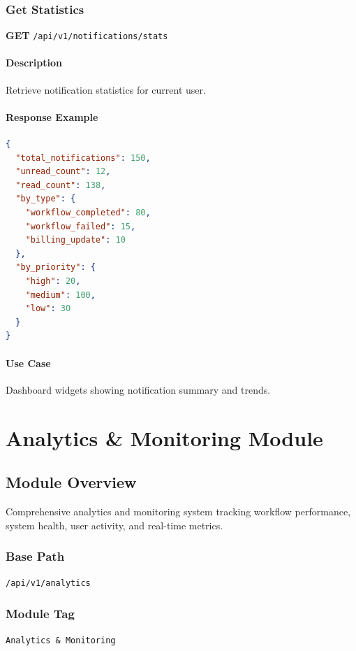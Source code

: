 \documentclass[11pt,a4paper]{report}
\begin{document}
\subsection{Get Statistics}

\textbf{GET} \texttt{/api/v1/notifications/stats}

\subsubsection{Description}
Retrieve notification statistics for current user.

\subsubsection{Response Example}
\begin{lstlisting}[style=jsoncode,language=json]
{
  "total_notifications": 150,
  "unread_count": 12,
  "read_count": 138,
  "by_type": {
    "workflow_completed": 80,
    "workflow_failed": 15,
    "billing_update": 10
  },
  "by_priority": {
    "high": 20,
    "medium": 100,
    "low": 30
  }
}
\end{lstlisting}

\subsubsection{Use Case}
Dashboard widgets showing notification summary and trends.

\newpage

\chapter{Analytics \& Monitoring Module}

\section{Module Overview}

Comprehensive analytics and monitoring system tracking workflow performance, system health, user activity, and real-time metrics.

\subsection{Base Path}
\texttt{/api/v1/analytics}

\subsection{Module Tag}
\texttt{Analytics \& Monitoring}
\end{document}
